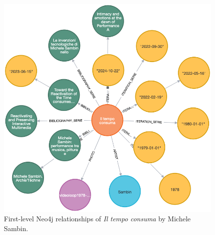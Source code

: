 \begin{figure}[!h]
    \centering
    \includegraphics[width=1\linewidth]{chapters/4-MDC_model_application/image/neo4j-artworkrelation.png}
    \caption{First-level Neo4j relationships of \textit{Il tempo consuma} by Michele Sambin.}
    \label{fig:c4-neo4j-artworkrelation}
\end{figure}

